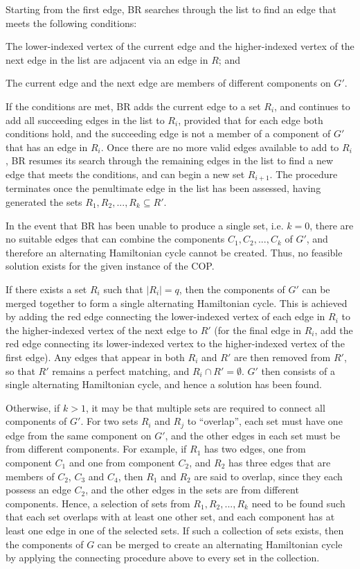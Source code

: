 \documentclass[oribibl]{llncs}
\begin{document}
Starting from the first edge, BR searches through the list to find an edge that meets the following conditions: 
\begin{enumerate*}[label={(\alph*)}]
	\item The lower-indexed vertex of the current edge and the higher-indexed vertex of the next edge in the list are adjacent via an edge in $R$; and
	\item The current edge and the next edge are members of different components on $G'$.
\end{enumerate*}

If the conditions are met, BR adds the current edge to a set $R_i$, and continues to add all succeeding edges in the list to $R_i$, provided that for each edge both conditions hold, and the succeeding edge is not a member of a component of $G'$ that has an edge in $R_i$. Once there are no more valid edges available to add to $R_i$, BR resumes its search through the remaining edges in the list to find a new edge that meets the conditions, and can begin a new set $R_{i+1}$. The procedure terminates once the penultimate edge in the list has been assessed, having generated the sets $R_1, R_2, ..., R_k \subseteq R'$.

In the event that BR has been unable to produce a single set, i.e. $k = 0$, there are no suitable edges that can combine the components $C_1, C_2, ..., C_k$ of $G'$, and therefore an alternating Hamiltonian cycle cannot be created. Thus, no feasible solution exists for the given instance of the COP.

If there exists a set $R_i$ such that $|R_i| = q$, then the components of $G'$ can be merged together to form a single alternating Hamiltonian cycle. This is achieved by adding the red edge connecting the lower-indexed vertex of each edge in $R_i$ to the higher-indexed vertex of the next edge to $R'$ (for the final edge in $R_i$, add the red edge connecting its lower-indexed vertex to the higher-indexed vertex of the first edge). Any edges that appear in both $R_i$ and $R'$ are then removed from $R'$, so that $R'$ remains a perfect matching, and $R_i \cap R' = \emptyset$. $G'$ then consists of a single alternating Hamiltonian cycle, and hence a solution has been found.

Otherwise, if $k > 1$, it may be that multiple sets are required to connect all components of $G'$. For two sets $R_i$ and $R_j$ to ``overlap'', each set must have one edge from the same component on $G'$, and the other edges in each set must be from different components. For example, if $R_1$ has two edges, one from component $C_1$ and one from component $C_2$, and $R_2$ has three edges that are members of $C_2$, $C_3$ and $C_4$, then $R_1$ and $R_2$ are said to overlap, since they each possess an edge $C_2$, and the other edges in the sets are from different components. Hence, a selection of sets from $R_1, R_2, ..., R_k$ need to be found such that each set overlaps with at least one other set, and each component has at least one edge in one of the selected sets. If such a collection of sets exists, then the components of $G$ can be merged to create an alternating Hamiltonian cycle by applying the connecting procedure above to every set in the collection.
\end{document}
